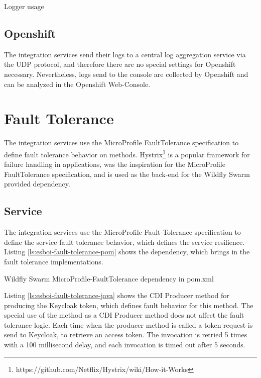 \begin{listing}[h]
	\caption{Logger usage}
	\label{ls:esboi-logging-java}
\end{listing} 

\subsection{Openshift}
\label{sec:esbi-logging-openshift}
The integration services send their logs to a central log aggregation service via the UDP protocol, and therefore there are no special settings for Openshift necessary. Nevertheless, logs send to the console are collected by Openshift and can be analyzed in the Openshift Web-Console.

\section{Fault Tolerance}
\label{sec:esbi-fault}
The integration services use the MicroProfile FaultTolerance specification to define fault tolerance behavior on methods. Hystrix\footnote{https://github.com/Netflix/Hystrix/wiki/How-it-Works} is a popular framework for failure handling in applications, was the inspiration for the MicroProfile FaultTolerance specification, and is used as the back-end for the Wildfly Swarm provided dependency.

\subsection{Service}
\label{sec:esbi-fault-service}
The integration services use the MicroProfile Fault-Tolerance specification to define the service fault tolerance behavior, which defines the service resilience. Listing \vref{ls:esboi-fault-tolerance-pom} shows the dependency, which brings in the fault tolerance implementations.

\begin{listing}[h]
	\caption{Wildfly Swarm MicroProfile-FaultTolerance dependency in pom.xml}
	\label{ls:esboi-fault-tolerance-pom}
\end{listing}

Listing \vref{ls:esboi-fault-tolerance-java} shows the CDI Producer method for producing the Keycloak token, which defines fault behavior for this method. The special use of the method as a CDI Producer method does not affect the fault tolerance logic. Each time when the producer method is called a token request is send to Keycloak, to retrieve an access token. The invocation is retried 5 times with a 100 millisecond delay, and each invocation is timed out after 5 seconds.

